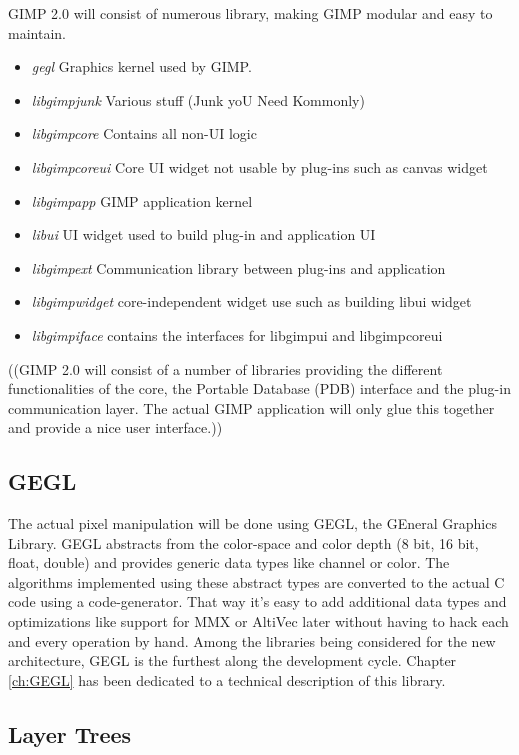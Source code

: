 GIMP 2.0 will consist of numerous library, making GIMP modular and easy to maintain.   
\begin{itemize}
\item {\em gegl} Graphics kernel used by GIMP.
\item {\em libgimpjunk} Various stuff (Junk yoU Need Kommonly)
\item {\em libgimpcore} Contains all non-UI logic
\item {\em libgimpcoreui} Core UI widget not usable by plug-ins such as canvas widget
\item {\em libgimpapp} GIMP application kernel
\item {\em libui} UI widget used to build plug-in and application UI
\item {\em libgimpext} Communication library between plug-ins and application
\item {\em libgimpwidget} core-independent widget use such as building libui widget
\item {\em libgimpiface} contains the interfaces for libgimpui and libgimpcoreui
\end{itemize}

((GIMP 2.0 will consist of a number of libraries providing the different
functionalities of the core, the Portable Database (PDB) interface and
the plug-in communication layer. The actual GIMP application will only
glue this together and provide a nice user interface.))

\subsection{GEGL}

The actual pixel manipulation will be done using GEGL, the GEneral
Graphics Library. GEGL abstracts from the color-space and color depth
(8 bit, 16 bit, float, double) and provides generic data types like
channel or color. The algorithms implemented using these abstract
types are converted to the actual C code using a code-generator. That
way it's easy to add additional data types and optimizations like
support for MMX or AltiVec later without having to hack each and every
operation by hand. Among the libraries being considered for the new
architecture, GEGL is the furthest along the development cycle.
Chapter \ref{ch:GEGL} has been dedicated to a technical description
of this library.

\subsection{Layer Trees}
 
